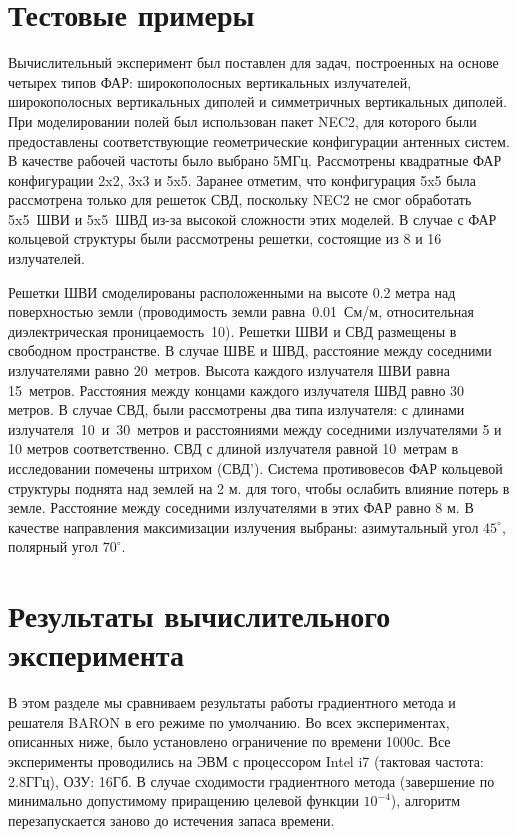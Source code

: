 \section{Тестовые примеры}\label{subsec:examples}

Вычислительный эксперимент был поставлен для задач, построенных на основе четырех типов ФАР: широкополосных вертикальных излучателей, широкополосных вертикальных диполей и симметричных вертикальных диполей. При моделировании полей был использован пакет NEC2, для которого были предоставлены соответствующие геометрические конфигурации антенных систем. В качестве рабочей частоты было выбрано 5МГц. Рассмотрены квадратные ФАР конфигурации 2x2, 3x3 и 5x5. Заранее отметим, что конфигурация 5x5 была рассмотрена только для решеток СВД, поскольку NEC2 не смог обработать 5x5~ШВИ и 5x5~ШВД из-за высокой сложности этих моделей. В случае с ФАР кольцевой структуры были рассмотрены решетки, состоящие из 8 и 16 излучателей.

Решетки ШВИ смоделированы расположенными на высоте 0.2 метра над поверхностью земли (проводимость земли равна~0.01~См/м, относительная диэлектрическая проницаемость~10). Решетки ШВИ и СВД размещены в свободном пространстве. В случае ШВЕ и ШВД, расстояние между соседними излучателями равно 20~метров. Высота каждого излучателя ШВИ равна 15~метров. Расстояния между концами каждого излучателя ШВД равно 30 метров. В случае СВД, были рассмотрены два типа излучателя: с длинами излучателя~10~и~30~метров и расстояниями между соседними излучателями 5 и 10 метров соответственно. СВД с длиной излучателя равной 10~метрам в исследовании помечены штрихом (СВД'). Система противовесов ФАР кольцевой структуры поднята над землей на 2 м. для того, чтобы ослабить влияние потерь в земле. Расстояние между соседними излучателями в этих ФАР равно 8 м. В качестве направления максимизации излучения выбраны: азимутальный угол $45^{\circ}$, полярный угол $70^{\circ}$.

\section{Результаты вычислительного эксперимента} \label{subsec:results}

В этом разделе мы сравниваем результаты работы градиентного метода и решателя BARON в его режиме по умолчанию. Во всех экспериментах, описанных ниже, было установлено ограничение по времени 1000с. Все эксперименты проводились на ЭВМ с процессором Intel i7 (тактовая частота: 2.8ГГц), ОЗУ: 16Гб. В случае сходимости градиентного метода (завершение по минимально допустимому приращению целевой функции $10^{-4}$), алгоритм перезапускается заново до истечения запаса времени.

